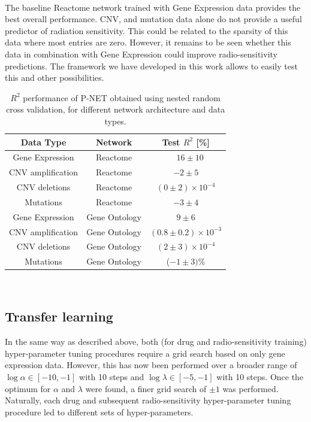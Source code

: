 \documentclass[NOTE, disdraft=true, UKenglish]{\DISCDTLATEXPATH UCLCDTDISdoc}
\begin{document}
\\ \indent The baseline Reactome network trained with Gene Expression data provides the best overall performance. CNV, and mutation data alone do not provide a useful predictor of radiation sensitivity.
This could be related to the sparsity of this data where most entries are zero.
However, it remains to be seen whether this data in combination with Gene Expression could improve radio-sensitivity predictions. The framework we have developed in this work allows to easily test this and other possibilities.
\begin{table}[]
    \centering
 \caption{$R^2$ performance of P-NET obtained using nested random cross validation, for different network architecture and data types.}

    \begin{tabular}{c|c|c}
     Data Type    & Network & Test $R^2$ [\%] \\ \hline
 Gene Expression  & Reactome & \ \ $16\pm 10$\\
CNV amplification & Reactome & $-2\pm 5$ \\
CNV deletions & Reactome & $(0 \pm 2)\times 10^{-4}$\\
Mutations & Reactome & $-3\pm4$\\
 Gene Expression  & Gene Ontology& $9\pm 6$\\
CNV amplification & Gene Ontology & $(0.8\pm 0.2)\times 10^{-3}$ \\
CNV deletions & Gene Ontology & $(2\pm 3)\times 10^{-4}$ \\
Mutations & Gene Ontology & ($-1\pm 3)$\%\\
    \end{tabular}
    \label{tab:perf}
\end{table}
\\

\subsection{Transfer learning}

In the same way as described above, both (for drug and radio-sensitivity training) hyper-parameter tuning procedures require a grid search based on only gene expression data. However, this has now been performed over a broader range of $\log{\alpha}\in [-10,-1]$ with 10 steps and $\log{\lambda}\in [-5,-1]$ with 10 steps. Once the optimum for $\alpha$ and $\lambda$ were found, a finer grid search of $\pm 1$ was performed. Naturally, each drug and subsequent radio-sensitivity hyper-parameter tuning procedure led to different sets of hyper-parameters.
\end{document}
